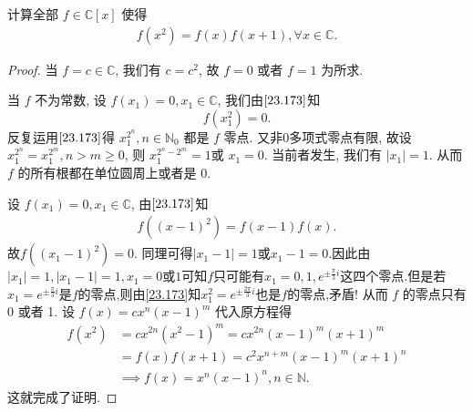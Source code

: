 \documentclass[../../main.tex]{subfiles}
\begin{document}
\begin{example}
计算全部 \( f \in \mathbb{C}[x] \) 使得
\begin{align}
f(x^2) = f(x)f(x+1), \forall x \in \mathbb{C}. \label{23.173}
\end{align}
\end{example}
\begin{proof}
当 \( f = c \in \mathbb{C} \), 我们有 \( c = c^2 \), 故 \( f = 0 \) 或者 \( f = 1 \) 为所求.

当 \( f \) 不为常数, 设 \( f(x_1) = 0, x_1 \in \mathbb{C} \), 我们由\(\eqref{23.173}\)知
\[
f(x_1^2) = 0.
\]
反复运用\(\eqref{23.173}\)得 \( x_1^{2^n}, n \in \mathbb{N}_0 \) 都是 \( f \) 零点. 又非0多项式零点有限, 故设 \( x_1^{2^n} = x_1^{2^m}, n > m \geq 0 \), 则 \( x_1^{2^n - 2^m} = 1 \)或 \( x_1 = 0 \). 当前者发生, 我们有 \( |x_1| = 1 \). 从而 \( f \) 的所有根都在单位圆周上或者是 0.

设 \( f(x_1) = 0, x_1 \in \mathbb{C} \), 由\(\eqref{23.173}\)知 
\begin{align*}
f((x-1)^2)=f(x-1)f(x).
\end{align*}
故\( f\left( (x_1 - 1)^2 \right) = 0 \). 同理可得\( |x_1 - 1| = 1 \)或$x_1-1=0$.因此由$|x_1|=1,|x_1-1|=1,x_1=0\text{或}1$可知$f$只可能有$x_1=0,1,e^{\pm \frac{\pi}{3}i} $这四个零点.但是若$x_1=e^{\pm \frac{\pi}{3}i}$是$f$的零点,则由\eqref{23.173}知$x_1^2=e^{\pm \frac{2\pi}{3}i}$也是$f$的零点,矛盾!
从而 \( f \) 的零点只有 0 或者 1. 设 \( f(x) = cx^n(x - 1)^m \) 代入原方程得
\begin{align*}
f(x^2) &= cx^{2n}(x^2 - 1)^m = cx^{2n}(x - 1)^m(x + 1)^m \\
&= f(x)f(x+1) = c^2x^{n+m}(x - 1)^m(x + 1)^n \\
&\implies f(x) = x^n(x - 1)^n, n \in \mathbb{N}.
\end{align*}
这就完成了证明.

\end{proof}
\end{document}
